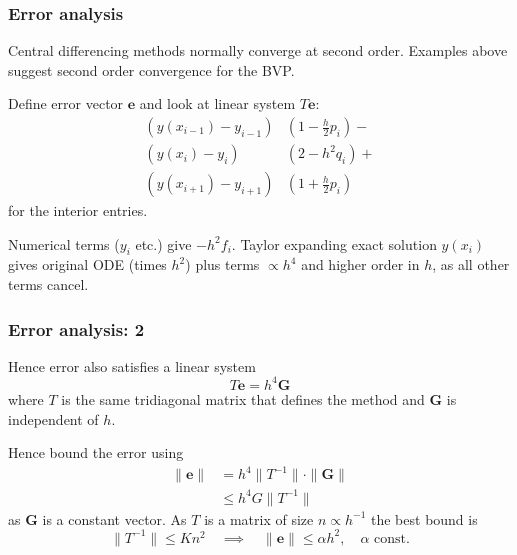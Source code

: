 \documentclass{beamer}
\newcommand{\bfm}[1]{{\boldsymbol{#1}}}
\begin{document}
\begin{frame}
  \frametitle{Error analysis}

  Central differencing methods normally converge at second order.
  Examples above suggest second order convergence for the BVP. \pause

  \vspace{1ex}

  Define error vector $\bfm{e}$ and look at linear system $T
  \bfm{e}$:
  \begin{align*}
    \left( y(x_{i-1}) - y_{i-1} \right)& \left( 1 - \tfrac{h}{2} p_i
    \right) - \\
    \left( y(x_{i}) - y_{i} \right) & \left( 2 - h^2 q_i \right) + \\
    \left( y(x_{i+1}) - y_{i+1} \right) & \left( 1 + \tfrac{h}{2} p_i
    \right)
  \end{align*}
  for the interior entries. \pause

  \vspace{1ex}

  Numerical terms ($y_i$ etc.) give $-h^2 f_i$. \pause Taylor
  expanding exact solution $y(x_i)$ gives original ODE (times $h^2$)
  plus terms $\propto h^4$ and higher order in $h$, as all other terms
  cancel.

\end{frame}

\begin{frame}
  \frametitle{Error analysis: 2}

  Hence error also satisfies a linear system
  \begin{equation*}
    T \bfm{e} = h^4 \bfm{G}
  \end{equation*}
  where $T$ is the same tridiagonal matrix that defines the method and
  $\bfm{G}$ is independent of $h$. \pause

  \vspace{1ex}

  Hence bound the error using
  \begin{align*}
    \| \bfm{e} \| & = h^4 \| T^{-1} \| \cdot \| \bfm{G} \| \\
    & \le h^4 G \| T^{-1} \|
  \end{align*}
  as $\bfm{G}$ is a constant vector. \pause As $T$ is a matrix of size
  $n \propto h^{-1}$ the best bound is
  \begin{equation*}
     \| T^{-1} \| \le K n^2 \quad \implies \quad
    \| \bfm{e} \| \le \alpha h^2, \quad \alpha \text{ const.}
  \end{equation*}

\end{frame}
\end{document}
